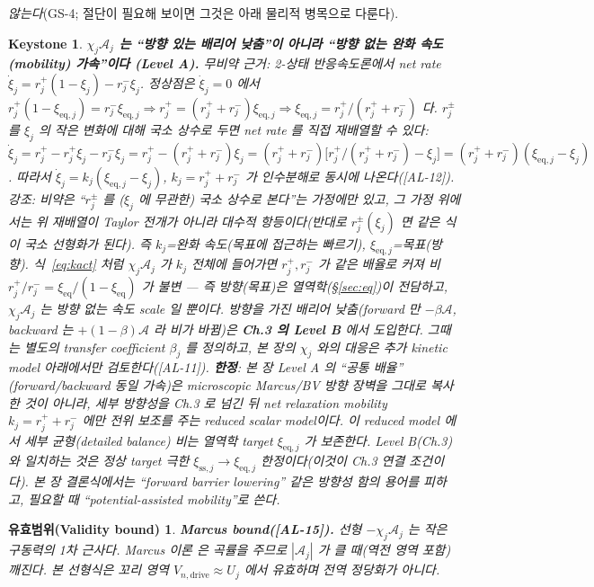 \documentclass[11pt,a4paper]{article}
\newtheorem*{boundbox}{유효범위(Validity bound)}
\newtheorem*{keybox}{Keystone}
\newcommand{\eq}{\mathrm{eq}}
\newcommand{\drive}{\mathrm{drive}}
\newcommand{\AL}[1]{\textsf{[AL-#1]}}
\begin{document}
\emph{않는다}(GS-4; 절단이 필요해 보이면 그것은 아래 물리적 병목으로 다룬다).
\begin{keybox}
\textbf{$\chi_j\mathcal A_j$ 는 ``방향 있는 배리어 낮춤''이 아니라 ``방향 없는 완화 속도(mobility) 가속''이다
(Level A).} 무비약 근거: 2-상태 반응속도론에서 net rate $\dot\xi_j=r_j^+(1-\xi_j)-r_j^-\xi_j$. 정상점은
$\dot\xi_j=0$ 에서 $r_j^+(1-\xi_{\eq,j})=r_j^-\xi_{\eq,j}\Rightarrow r_j^+=(r_j^++r_j^-)\xi_{\eq,j}
\Rightarrow\xi_{\eq,j}=r_j^+/(r_j^++r_j^-)$ 다. $r_j^\pm$ 를 $\xi_j$ 의 작은 변화에 대해 국소 상수로 두면
net rate 를 직접 재배열할 수 있다: $\dot\xi_j=r_j^+-r_j^+\xi_j-r_j^-\xi_j=r_j^+-(r_j^++r_j^-)\xi_j
=(r_j^++r_j^-)\big[r_j^+/(r_j^++r_j^-)-\xi_j\big]=(r_j^++r_j^-)(\xi_{\eq,j}-\xi_j)$. 따라서
$\dot\xi_j=k_j(\xi_{\eq,j}-\xi_j)$, $k_j=r_j^++r_j^-$ 가 인수분해로 동시에 나온다(\AL{12}). \emph{강조}: 비약은
``$r_j^\pm$ 를 ($\xi_j$ 에 무관한) 국소 상수로 본다''는 \emph{가정}에만 있고, 그 가정 위에서는 위 재배열이 Taylor
전개가 아니라 대수적 항등이다(반대로 $r_j^\pm(\xi_j)$ 면 같은 식이 국소 선형화가 된다). 즉 $k_j$=완화 속도(목표에 접근하는 빠르기),
$\xi_{\eq,j}$=목표(방향). 식~\eqref{eq:kact} 처럼 $\chi_j\mathcal A_j$ 가 \emph{$k_j$
전체}에 들어가면 $r_j^+,r_j^-$ 가 같은 배율로 커져 비 $r_j^+/r_j^-=\xi_\eq/(1-\xi_\eq)$ 가 \emph{불변}
— 즉 방향(목표)은 열역학(\S\ref{sec:eq})이 전담하고, $\chi_j\mathcal A_j$ 는 방향 없는 속도 scale 일 뿐이다.
\emph{방향을 가진} 배리어 낮춤(forward 만 $-\beta\mathcal A$, backward 는 $+(1-\beta)\mathcal A$ 라 비가 바뀜)은 \textbf{Ch.3 의 Level B} 에서 도입한다.
그때는 별도의 transfer coefficient $\beta_j$ 를 정의하고, 본 장의 $\chi_j$ 와의 대응은 추가 kinetic model 아래에서만 검토한다(\AL{11}).
\textbf{한정}: 본 장 Level A 의 ``공통 배율''
(forward/backward 동일 가속)은 microscopic Marcus/BV 방향 장벽을 그대로 복사한 것이 아니라, 세부 방향성을 Ch.3 로 넘긴 뒤
net relaxation mobility $k_j=r_j^++r_j^-$ 에만 전위 보조를 주는 \emph{reduced scalar model}이다. 이 reduced model 에서
세부 균형(detailed balance) 비는 열역학 target $\xi_{\eq,j}$ 가 보존한다. Level B(Ch.3)와 일치하는 것은
\emph{정상 target 극한} $\xi_{\mathrm{ss},j}\to\xi_{\eq,j}$ 한정이다(이것이 Ch.3 연결 조건이다). 본 장
결론식에서는 ``forward barrier lowering'' 같은 방향성 함의 용어를 피하고, 필요할 때 ``potential-assisted mobility''로 쓴다.
\end{keybox}
\begin{boundbox}
\textbf{Marcus bound(\AL{15}).} 선형 $-\chi_j\mathcal A_j$ 는 작은 구동력의 1차 근사다. Marcus 이론
\cite{marcus1956} 은 곡률을 주므로 $|\mathcal A_j|$ 가 클 때(역전 영역 포함) 깨진다. 본 선형식은 꼬리 영역
$V_{n,\drive}\approx U_j$ 에서 유효하며 전역 정당화가 아니다.
\end{boundbox}
\end{document}
